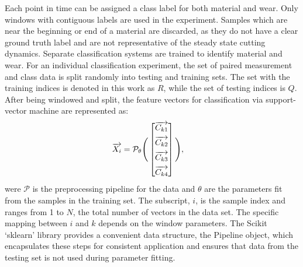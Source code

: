 Each point in time can be assigned a class label for both material and wear. 
Only windows with contiguous labels are used in the experiment. 
Samples which are near the beginning or end of a material are discarded, 
 as they do not have a clear ground truth label and are not representative of the
 steady state cutting dynamics.
Separate classification systems are trained to identify material and wear.
For an individual classification experiment, the set of paired measurement and class data
 is split randomly into testing and training sets.
The set with the training indices is denoted in this work as $R$, while the set of testing indices is $Q$.
After being windowed and split, the feature vectors for classification via 
 support-vector machine are represented as:
\begin{align}
\overrightarrow{X_i} &= \mathcal{P}_{\theta} \Bigg( \begin{bmatrix}  \overrightarrow{C_{k1}} \\[1ex]
                              \overrightarrow{C_{k2}} \\[1ex]
                              \overrightarrow{C_{k3}} \\[1ex]
                              \overrightarrow{C_{k4}} \end{bmatrix} \Bigg) ,
\end{align}
were $\mathcal{P}$ is the preprocessing pipeline for the data and $\theta$ are the parameters fit from the
 samples in the training set.
The subscript, $i$, is the sample index and ranges from 1 to $N$, the total number of vectors
 in the data set. The specific mapping between $i$ and $k$ depends on the window parameters.
The Scikit `sklearn' library \cite{chang11, platt99} provides a convenient data structure, the Pipeline object, 
 which encapsulates these steps for consistent application and ensures that data from the 
 testing set is not used during parameter fitting. 

